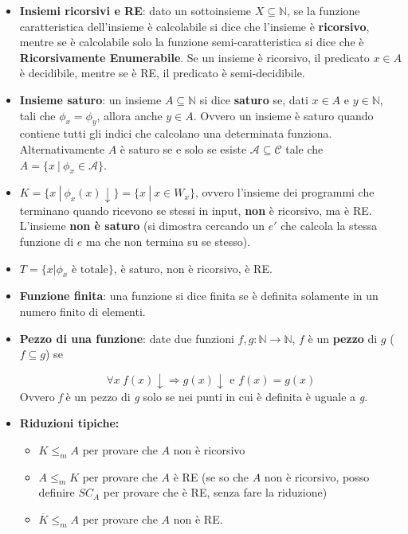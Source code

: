 \begin{itemize}
	\item \textbf{Insiemi ricorsivi e RE}: dato un sottoinsieme $X \subseteq \mathbb{N}$, se la funzione caratteristica dell'insieme è calcolabile si dice che l'insieme è \textbf{ricorsivo}, mentre se è calcolabile solo la funzione semi-caratteristica si dice che è \textbf{Ricorsivamente Enumerabile}. Se un insieme è ricorsivo, il predicato $x \in A$ è decidibile, mentre se è RE, il predicato è semi-decidibile.
	
	\item \textbf{Insieme saturo}: un insieme $A \subseteq \mathbb{N}$ si dice \textbf{saturo} se, dati $x \in A$ e $y \in \mathbb{N}$, tali che $\phi_x = \phi_y$, allora anche $y \in A$. Ovvero un insieme è saturo quando contiene tutti gli indici che calcolano una determinata funziona. Alternativamente $A$ è saturo se e solo se esiste $\mathcal{A} \subseteq \mathcal{C}$ tale che $A = \{ x \: | \: \phi_x \in \mathcal{A} \}$.
	
	\item $K = \{ x \: | \: \phi_x(x) \downarrow \} = \{ x \: | \: x \in W_x \}$, ovvero l'insieme dei programmi che terminano quando ricevono se stessi in input, \textbf{non} è ricorsivo, ma è RE. L'insieme \textbf{non è saturo} (si dimostra cercando un $e'$ che calcola la stessa funzione di $e$ ma che non termina su se stesso).
	
	\item $T = \{ x | \phi_x \text{ è totale} \}$, è saturo, non è ricorsivo, è RE.
	
	\item \textbf{Funzione finita}: una funzione si dice finita se è definita solamente in un numero finito di elementi.
	
	\item \textbf{Pezzo di una funzione}: date due funzioni $f,g : \mathbb{N} \rightarrow \mathbb{N}$, $f$ è un \textbf{pezzo} di $g$ ($f \subseteq g$) se
	
	$$
	\forall x \: f(x) \downarrow \Rightarrow g(x) \downarrow \text{ e } f(x) = g(x)
	$$
	Ovvero \textit{f} è un pezzo di \textit{g} solo se nei punti in cui è definita è uguale a \textit{g}.
	
	\item \textbf{Riduzioni tipiche:}
	\begin{itemize}
		\item $K \leq_m A$ per provare che $A$ non è ricorsivo
		\item $A \leq_m K$ per provare che $A$ è RE (se so che $A$ non è ricorsivo, posso definire $SC_A$ per provare che è RE, senza fare la riduzione)
		\item $\overline{K} \leq_m A$ per provare che $A$ non è RE.
	\end{itemize}
\end{itemize}

